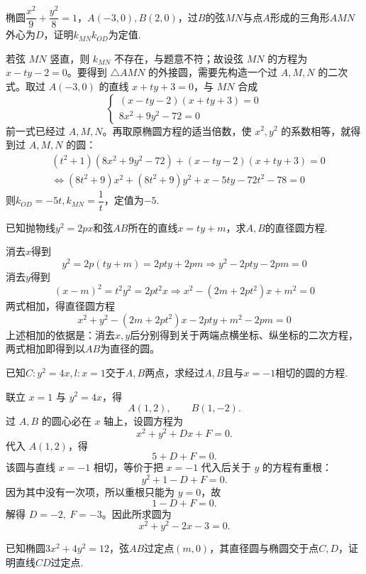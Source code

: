     \begin{example}[（2025八省联考）]
    椭圆$\dfrac{x^2}{9}+\dfrac{y^2}{8}=1$，$A(-3,0),B(2,0)$，过$B$的弦$MN$与点$A$形成的三角形$AMN$外心为$D$，证明$k_{MN}k_{OD}$为定值.
\end{example}
\begin{solution}
    若弦 $MN$ 竖直，则 $k_{MN}$ 不存在，与题意不符；故设弦 $MN$ 的方程为 $x-ty-2=0$。要得到 $\triangle AMN$ 的外接圆，需要先构造一个过 $A,M,N$ 的二次式。取过 $A(-3,0)$ 的直线 $x+ty+3=0$，与 $MN$ 合成
\[\begin{cases}(x-ty-2)(x+ty+3)=0\\8x^2+9y^2-72=0\end{cases}\]
    前一式已经过 $A,M,N$。再取原椭圆方程的适当倍数，使 $x^2,y^2$ 的系数相等，就得到过 $A,M,N$ 的圆：
    \begin{align*}&(t^{2}+1)(8x^{2}+9y^{2}-72)+(x-ty-2)(x+ty+3)=0\\&\Leftrightarrow{}(8t^{2}+9)x^{2}+(8t^{2}+9)y^{2}+x-5ty-72t^{2}-78=0\end{align*}
    则$k_{OD}=-5t,k_{MN}=\dfrac1{t}$，定值为$-5$.
\end{solution}
\begin{example}[（直径圆的求法）]
    已知抛物线$y^2=2px$和弦$AB$所在的直线$x=ty+m$，求$A,B$的直径圆方程.
\end{example}
\begin{solution}
    消去$x$得到\[y^2=2p(ty+m)=2pty+2pm\Rightarrow y^2-2pty-2pm=0\]
    消去$y$得到\[(x-m)^2=t^2y^2=2pt^2x\Rightarrow x^2-(2m+2pt^2)x+m^2=0\]
    两式相加，得直径圆方程
    \[x^2+y^2-(2m+2pt^2)x-2pty+m^2-2pm=0\]
    上述相加的依据是：消去$x,y$后分别得到关于两端点横坐标、纵坐标的二次方程，两式相加即得到以$AB$为直径的圆。
\end{solution}
\begin{example}[（过两点的圆系方程例题）]
    已知$C:y^2=4x,l:x=1$交于$A,B$两点，求经过$A,B$且与$x=-1$相切的圆的方程.
\end{example}
\begin{solution}
    联立 $x=1$ 与 $y^2=4x$，得
    \[
    A(1,2),\qquad B(1,-2).
    \]
    过 $A,B$ 的圆心必在 $x$ 轴上，设圆方程为
    \[
    x^2+y^2+Dx+F=0.
    \]
    代入 $A(1,2)$，得
    \[
    5+D+F=0.
    \]
    该圆与直线 $x=-1$ 相切，等价于把 $x=-1$ 代入后关于 $y$ 的方程有重根：
    \[
    y^2+1-D+F=0.
    \]
    因为其中没有一次项，所以重根只能为 $y=0$，故
    \[
    1-D+F=0.
    \]
    解得 $D=-2,\ F=-3$。因此所求圆为
    \[
    x^2+y^2-2x-3=0.
    \]
\end{solution}
\begin{example}[（直径圆习题）]
    已知椭圆$3x^2+4y^2=12$，弦$AB$过定点$(m,0)$，其直径圆与椭圆交于点$C,D$，证明直线$CD$过定点.
\end{example}
